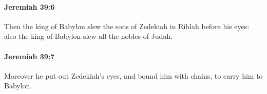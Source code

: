 		\paragraph{Jeremiah 39:6} %
			\label{JEREMIAH-39-6}

			Then the king of Babylon slew the sons of Zedekiah in Riblah before his eyes: also the king of Babylon slew all the nobles of Judah.


		\paragraph{Jeremiah 39:7} %
			\label{JEREMIAH-39-7}

			Moreover he put out Zedekiah’s eyes, and bound him with chains, to carry him to Babylon.


